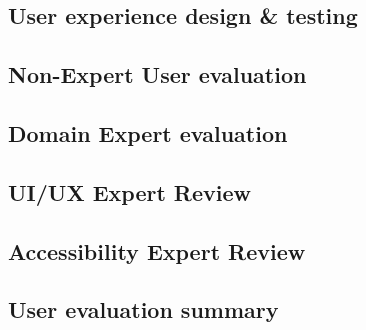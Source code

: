 \subsection{User experience design \& testing}


\newpage{}
\subsection{Non-Expert User evaluation}


\newpage{}
\subsection{Domain Expert evaluation}


\newpage{}
\subsection{UI/UX Expert Review}


\newpage{}
\subsection{Accessibility Expert Review}


\newpage{}
\subsection{User evaluation summary}

